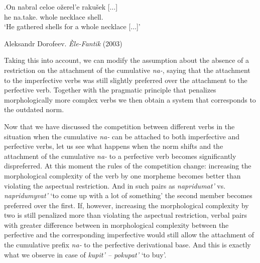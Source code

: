 \exg.\label{ex:nabrat}On nabral celoe o\v{z}erel'e raku\v{s}ek [$\ldots$]\\
he na.take. whole necklace shell.\\
\vspace{0.5em}
`He gathered shells for a whole necklace [$\ldots$]'
\begin{flushright}
\vspace{-0.5em}
Aleksandr Dorofeev. \textit{\`{E}le-Fantik} (2003)
\end{flushright}

Taking this into account, we can modify the assumption about the absence of a restriction on the attachment of the cumulative \textit{na-}, saying that the attachment to the imperfective verbs was still slightly preferred over the attachment to the perfective verb. Together with the pragmatic principle that penalizes morphologically more complex verbs we then obtain a system that corresponds to the outdated norm. 

Now that we have discussed the competition between different verbs in the situation when the cumulative \textit{na-} can be attached to both imperfective and perfective verbs, let us see what happens when the norm shifts and the attachment of the cumulative \textit{na-} to a perfective verb becomes significantly dispreferred. At this moment the rules of the competition change: increasing the morphological complexity of the verb by one morpheme becomes better than violating the aspectual restriction. And in such pairs as \textit{napridumat'} vs. \textit{napridumyvat'} `to come up with a lot of something' the second member becomes preferred over the first. If, however, increasing the morphological complexity by two is still penalized more than violating the aspectual restriction, verbal pairs with greater difference between in morphological complexity between the perfective and the corresponding imperfective would still allow the attachment of the cumulative prefix \textit{na-} to the perfective derivational base. And this is exactly what we observe in case of \textit{kupit' -- pokupat'} `to buy'.


